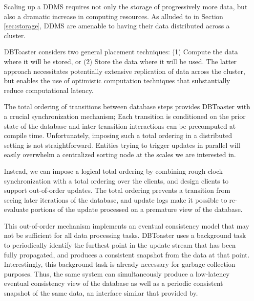 Scaling up a DDMS requires not only the storage of progressively more data, but also a dramatic increase in computing resources.  As alluded to in Section \ref{sec:storage}, DDMS are amenable to having their data distributed across a cluster.  


DBToaster considers two general placement techniques: (1) Compute the data where it will be stored, or (2) Store the data where it will be used.  The latter approach necessitates potentially extensive replication of data across the cluster, but enables the use of optimistic computation techniques that substantially reduce computational latency.

The total ordering of transitions between database steps provides DBToaster with a crucial synchronization mechanism; Each transition is conditioned on the prior state of the database and inter-transition interactions can be precomputed at compile time.  Unfortunately, imposing such a total ordering in a distributed setting is not straightforward.  Entities trying to trigger updates in parallel will easily overwhelm a centralized sorting node at the scales we are interested in.  

Instead, we can impose a logical total ordering by combining rough clock synchronization with a total ordering over the clients, and design clients to support out-of-order updates.  The total ordering prevents a transition from seeing later iterations of the database, and update logs make it possible to re-evaluate portions of the update processed on a premature view of the database.  

This out-of-order mechanism implements an eventual consistency model that may not be sufficient for all data processing tasks.  DBToaster uses a background task to periodically identify the furthest point in the update stream that has been fully propagated, and produces a consistent snapshot from the data at that point.  Interestingly, this background task is already necessary for garbage collection purposes.  Thus, the same system can simultaneously produce a low-latency eventual consistency view of the database as well as a periodic consistent snapshot of the same data, an interface similar that provided by\cite{bayou}.